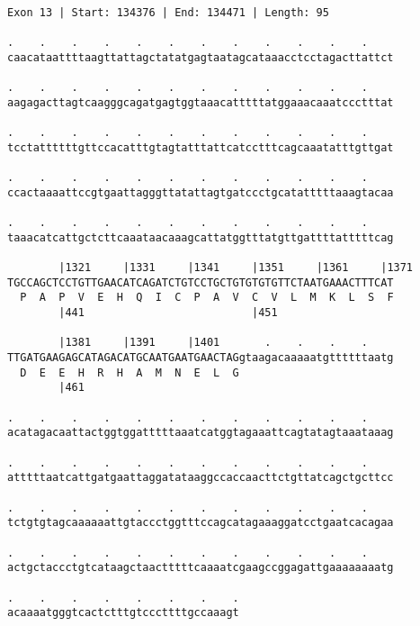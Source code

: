 \documentclass{article}
\begin{document}
\begin{Verbatim}[fontfamily=courier]
Exon 13 | Start: 134376 | End: 134471 | Length: 95

.    .    .    .    .    .    .    .    .    .    .    .    
caacataattttaagttattagctatatgagtaatagcataaacctcctagacttattct

.    .    .    .    .    .    .    .    .    .    .    .    
aagagacttagtcaagggcagatgagtggtaaacatttttatggaaacaaatccctttat

.    .    .    .    .    .    .    .    .    .    .    .    
tcctattttttgttccacatttgtagtatttattcatcctttcagcaaatatttgttgat

.    .    .    .    .    .    .    .    .    .    .    .    
ccactaaaattccgtgaattagggttatattagtgatccctgcatatttttaaagtacaa

.    .    .    .    .    .    .    .    .    .    .    .    
taaacatcattgctcttcaaataacaaagcattatggtttatgttgattttatttttcag

        |1321     |1331     |1341     |1351     |1361     |1371
TGCCAGCTCCTGTTGAACATCAGATCTGTCCTGCTGTGTGTGTTCTAATGAAACTTTCAT
  P  A  P  V  E  H  Q  I  C  P  A  V  C  V  L  M  K  L  S  F
        |441                          |451                  

        |1381     |1391     |1401       .    .    .    .    
TTGATGAAGAGCATAGACATGCAATGAATGAACTAGgtaagacaaaaatgttttttaatg
  D  E  E  H  R  H  A  M  N  E  L  G                        
        |461                                                

.    .    .    .    .    .    .    .    .    .    .    .    
acatagacaattactggtggatttttaaatcatggtagaaattcagtatagtaaataaag

.    .    .    .    .    .    .    .    .    .    .    .    
atttttaatcattgatgaattaggatataaggccaccaacttctgttatcagctgcttcc

.    .    .    .    .    .    .    .    .    .    .    .    
tctgtgtagcaaaaaattgtaccctggtttccagcatagaaaggatcctgaatcacagaa

.    .    .    .    .    .    .    .    .    .    .    .    
actgctaccctgtcataagctaactttttcaaaatcgaagccggagattgaaaaaaaatg

.    .    .    .    .    .    .    .
acaaaatgggtcactctttgtcccttttgccaaagt
\end{Verbatim}
\newpage
\end{document}
